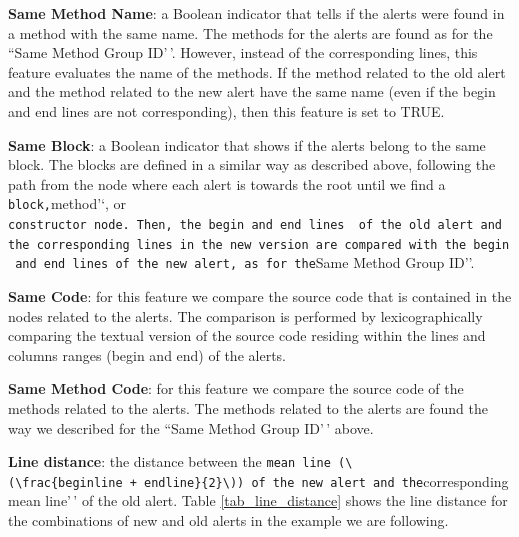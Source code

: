 \documentclass[
]{article}
\begin{document}
\normalsize

\noindent \textbf{Same Method Name}: a Boolean indicator that tells if
the alerts were found in a method with the same name. The methods for
the alerts are found as for the ``Same Method Group ID'\,'. However,
instead of the corresponding lines, this feature evaluates the name of
the methods. If the method related to the old alert and the method
related to the new alert have the same name (even if the begin and end
lines are not corresponding), then this feature is set to TRUE.

\noindent \textbf{Same Block}: a Boolean indicator that shows if the
alerts belong to the same block. The blocks are defined in a similar way
as described above, following the path from the node where each alert is
towards the root until we find a
\texttt{block\textquotesingle{}\textquotesingle{},}method'`, or
\texttt{constructor\textquotesingle{}\textquotesingle{}\ node.\ Then,\ the\ begin\ and\ end\ lines\ \ of\ the\ old\ alert\ and\ the\ corresponding\ lines\ in\ the\ new\ version\ are\ compared\ with\ the\ begin\ and\ end\ lines\ of\ the\ new\ alert,\ as\ for\ the}Same
Method Group ID''.

\noindent \textbf{Same Code}: for this feature we compare the source
code that is contained in the nodes related to the alerts. The
comparison is performed by lexicographically comparing the textual
version of the source code residing within the lines and columns ranges
(begin and end) of the alerts.

\noindent \textbf{Same Method Code}: for this feature we compare the
source code of the methods related to the alerts. The methods related to
the alerts are found the way we described for the ``Same Method Group
ID'\,' above.

\noindent \textbf{Line distance}: the distance between the
\texttt{mean\ line\textquotesingle{}\textquotesingle{}\ (\textbackslash{}(\textbackslash{}frac\{beginline\ +\ endline\}\{2\}\textbackslash{}))\ of\ the\ new\ alert\ and\ the}corresponding
mean line'\,' of the old alert. Table \ref{tab_line_distance} shows the
line distance for the combinations of new and old alerts in the example
we are following.

\small
\end{document}
